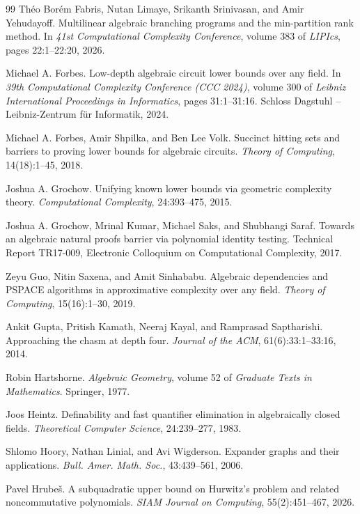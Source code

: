 \begin{thebibliography}{99}
Théo Borém Fabris, Nutan Limaye, Srikanth Srinivasan, and Amir Yehudayoff. Multilinear
algebraic branching programs and the min-partition rank method. In \emph{41st Computational
Complexity Conference}, volume 383 of \emph{LIPIcs}, pages 22:1--22:20, 2026.

Michael A. Forbes. Low-depth algebraic circuit lower bounds over any field. In \emph{39th
Computational Complexity Conference (CCC 2024)}, volume 300 of \emph{Leibniz International
Proceedings in
Informatics}, pages 31:1--31:16. Schloss Dagstuhl -- Leibniz-Zentrum für Informatik, 2024.

Michael A. Forbes, Amir Shpilka, and Ben Lee Volk. Succinct hitting sets and barriers to
proving lower bounds for algebraic circuits. \emph{Theory of Computing}, 14(18):1--45, 2018.

Joshua A. Grochow. Unifying known lower bounds via geometric complexity theory. \emph{Computational
Complexity}, 24:393--475, 2015.

Joshua A. Grochow, Mrinal Kumar, Michael Saks, and Shubhangi Saraf. Towards an algebraic
natural proofs barrier via polynomial identity testing. Technical Report TR17-009, Electronic
Colloquium on Computational Complexity, 2017.

Zeyu Guo, Nitin Saxena, and Amit Sinhababu. Algebraic dependencies and PSPACE algorithms
in approximative complexity over any field. \emph{Theory of Computing}, 15(16):1--30, 2019.

Ankit Gupta, Pritish Kamath, Neeraj Kayal, and Ramprasad Saptharishi. Approaching the
chasm at depth four. \emph{Journal of the ACM}, 61(6):33:1--33:16, 2014.

Robin Hartshorne. \emph{Algebraic Geometry}, volume 52 of \emph{Graduate Texts in Mathematics}. Springer,
1977.

Joos Heintz. Definability and fast quantifier elimination in algebraically closed fields. \emph{Theoretical
Computer Science}, 24:239--277, 1983.

Shlomo Hoory, Nathan Linial, and Avi Wigderson. Expander graphs and their applications.
\emph{Bull. Amer. Math. Soc.}, 43:439--561, 2006.

Pavel Hrube\v{s}. A subquadratic upper bound on Hurwitz's problem and related noncommutative
polynomials. \emph{SIAM Journal on Computing}, 55(2):451--467, 2026.


\end{thebibliography}
